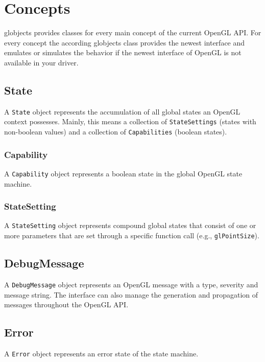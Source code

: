\documentclass{article}
\begin{document}
\section{Concepts}

globjects provides classes for every main concept of the current OpenGL API. For every concept the according globjects class provides the newest interface and emulates or simulates the behavior if the newest interface of OpenGL is not available in your driver.

\subsection{State}

A \lstinline|State| object represents the accumulation of all global states an OpenGL context possesses. Mainly, this means a collection of \lstinline|StateSettings| (states with non-boolean values) and a collection of \lstinline|Capabilities| (boolean states).

\subsubsection{Capability}

A \lstinline|Capability| object represents a boolean state in the global OpenGL state machine.

\subsubsection{StateSetting}

A \lstinline|StateSetting| object represents compound global states that consist of one or more parameters that are set through a specific function call (e.g., \lstinline|glPointSize|).

\subsection{DebugMessage}

A \lstinline|DebugMessage| object represents an OpenGL message with a type, severity and message string. The interface can also manage the generation and propagation of messages throughout the OpenGL API.

\subsection{Error}

A \lstinline|Error| object represents an error state of the state machine.
\end{document}
